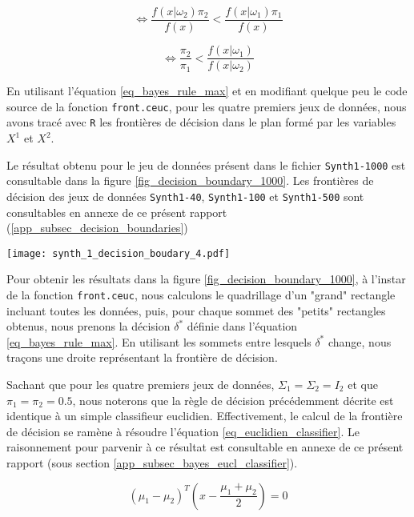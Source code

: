 \documentclass{article}
\begin{document}
\begin{multicols}{2}
\[
\iff 
\frac{f(x | \omega_2)\pi_2}{f(x)} < \frac{f(x | \omega_1)\pi_1}{f(x)}
\]

\begin{equation}
\label{eq_bayes_rule_max}
\iff 
\frac{\pi_2}{\pi_1} < \frac{f(x|\omega_1)}{f(x|\omega_2)}
\end{equation}

En utilisant l'équation \ref{eq_bayes_rule_max} et en modifiant quelque peu le code source de la fonction \texttt{front.ceuc}, pour les quatre premiers jeux de données, nous avons tracé avec \texttt{R} les frontières de décision dans le plan formé par les variables $X^1$ et $X^2$.

Le résultat obtenu pour le jeu de données présent dans le fichier \texttt{Synth1-1000} est consultable dans la figure \ref{fig_decision_boundary_1000}. Les frontières de décision des jeux de données \texttt{Synth1-40}, \texttt{Synth1-100} et \texttt{Synth1-500} sont consultables en annexe de ce présent rapport (\ref{app_subsec_decision_boundaries})

\begingroup
   \centering
   \texttt{[image: synth\_1\_decision\_boudary\_4.pdf]}
    \label{fig_decision_boundary_1000}
\endgroup


Pour obtenir les résultats dans la figure \ref{fig_decision_boundary_1000}, à l'instar de la fonction \texttt{front.ceuc}, nous calculons le quadrillage d'un "grand" rectangle incluant toutes les données, puis, pour chaque sommet des "petits" rectangles obtenus, nous prenons la décision $\delta^{\ast}$ définie dans l'équation \ref{eq_bayes_rule_max}. En utilisant les sommets entre lesquels $\delta^{\ast}$ change, nous traçons une droite représentant la frontière de décision. 

Sachant que pour les quatre premiers jeux de données, $\Sigma_1 = \Sigma_2 = I_2$ et que $\pi_1 = \pi_2 = 0.5$, nous noterons que la règle de décision précédemment décrite est identique à un simple classifieur euclidien. Effectivement, le calcul de la frontière de décision se ramène à résoudre l'équation \ref{eq_euclidien_classifier}. Le raisonnement pour parvenir à ce résultat est consultable en annexe de ce présent rapport (sous section \ref{app_subsec_bayes_eucl_classifier}).

\begin{equation}
\label{eq_euclidien_classifier}
(\mu_1 - \mu_2)^{T} \left( x - \frac{\mu_1 + \mu_2}{2} \right) = 0
\end{equation}


\end{multicols}
\end{document}
